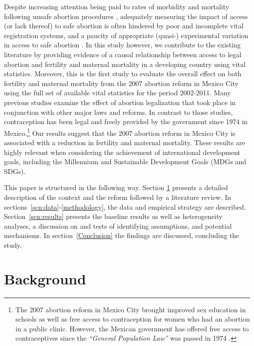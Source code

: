 \documentclass[a4paper, 11pt]{article}
\begin{document}
\begin{spacing}{2}
Despite increasing attention being paid to rates of morbidity and mortality following unsafe abortion procedures \citep{Grimes2006,Brown2007,Kulczycki2011}, adequately measuring the impact of access (or lack thereof) to safe abortion is often hindered by poor and incomplete vital registration systems, and a paucity of appropriate (quasi-) experimental variation in access to safe abortion \citep{Grimes2006}. In this study however, we contribute to the existing literature by providing evidence of a causal relationship between access to legal abortion and fertility and maternal mortality in a developing country using vital statistics. Moreover, this is the first study to evaluate the overall effect on both fertility and maternal mortality from the 2007 abortion reform in Mexico City using the full set of available vital statistics for the period 2002-2011. Many previous studies examine the effect of abortion legalization that took place in conjunction with other major laws and reforms. In contrast to those studies, contraception has been legal and freely provided by the government since 1974 in Mexico.\footnote{The 2007 abortion reform in Mexico City brought improved sex education in schools as well as free access to contraception for women who had an abortion in a public clinic. However, the Mexican government has offered free access to contraceptives since the \textit{``General Population Law''} was passed in 1974 \citep{GIRE2009}.} Our results suggest that the 2007 abortion reform in Mexico City is associated with a reduction in fertility and maternal mortality. These results are highly relevant when considering the achievement of international development goals, including the Millennium and Sustainable Development Goals (MDGs and SDGs).

This paper is structured in the following way. Section \ref{scn:background} presents a detailed description of the context and the reform followed by a literature review. In sections~\ref{scn:data}-\ref{methodology}, the data and empirical strategy are described. 
Section~\ref{scn:results} presents the baseline results as well as heterogeneity analyses, a discussion on and tests of identifying assumptions, and potential mechanisms. In section~\ref{Conclusion} the findings are discussed, concluding the study.


\section{Background} 
\label{scn:background}



\end{spacing}
\end{document}
